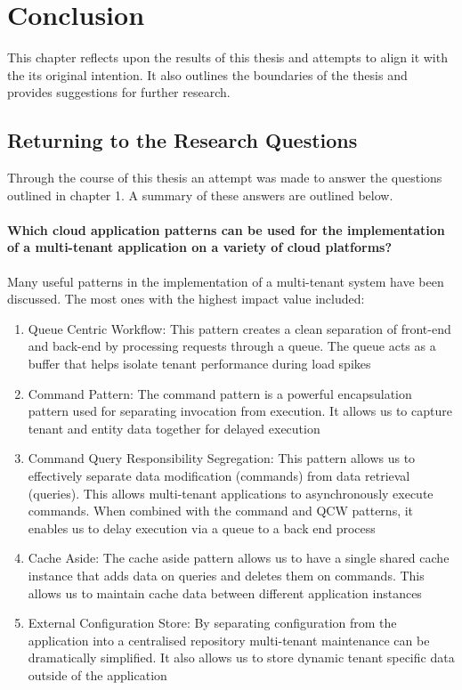 \chapter{Conclusion}

This chapter reflects upon the results of this thesis and attempts to align it with the its original intention. It also outlines the boundaries of the thesis and provides suggestions for further research. 

\section{Returning to the Research Questions}
Through the course of this thesis an attempt was made to answer the questions outlined in chapter 1. A summary of these answers are outlined below. 

\subsubsection{\textbf{Which cloud application patterns can be used for the implementation of a multi-tenant application on a variety of cloud platforms?}}

Many useful patterns in the implementation of a multi-tenant system have been discussed. The most ones with the highest impact value included:
\vfill
\begin{enumerate}
\item Queue Centric Workflow: This pattern creates a clean separation of front-end and back-end by processing requests through a queue. The queue acts as a buffer that helps isolate tenant performance during load spikes
\item Command Pattern: The command pattern is a powerful encapsulation pattern used for separating invocation from execution. It allows us to capture tenant and entity data together for delayed execution
\item Command Query Responsibility Segregation: This pattern allows us to effectively separate data modification (commands) from data retrieval (queries). This allows multi-tenant applications to asynchronously execute commands. When combined with the command and QCW patterns, it enables us to delay execution via a queue to a back end process
\item Cache Aside: The cache aside pattern allows us to have a single shared cache instance that adds data on queries and deletes them on commands. This allows us to maintain cache data between different application instances
\item External Configuration Store: By separating configuration from the application into a centralised repository multi-tenant maintenance can be dramatically simplified. It also allows us to store dynamic tenant specific data outside of the application
\end{enumerate}


